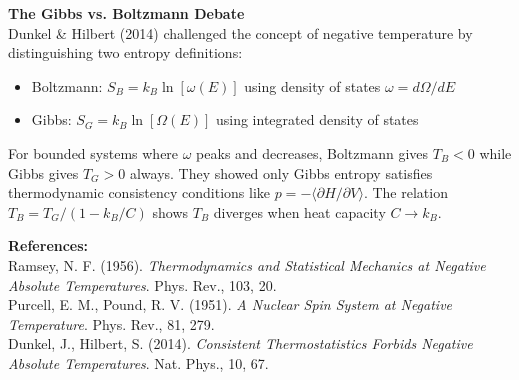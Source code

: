 \begin{technical}
\noindent\textbf{The Gibbs vs. Boltzmann Debate}\\[0.5em]
Dunkel \& Hilbert (2014) challenged the concept of negative temperature by distinguishing two entropy definitions:
\begin{itemize}[leftmargin=1em,itemsep=0pt,topsep=2pt]
\item Boltzmann: $S_B = k_B \ln[\omega(E)]$ using density of states $\omega = d\Omega/dE$
\item Gibbs: $S_G = k_B \ln[\Omega(E)]$ using integrated density of states
\end{itemize}
For bounded systems where $\omega$ peaks and decreases, Boltzmann gives $T_B < 0$ while Gibbs gives $T_G > 0$ always. They showed only Gibbs entropy satisfies thermodynamic consistency conditions like $p = -\langle \partial H/\partial V \rangle$. The relation $T_B = T_G/(1 - k_B/C)$ shows $T_B$ diverges when heat capacity $C \to k_B$.

\vspace{0.5em}
\noindent\textbf{References:}\\
Ramsey, N. F. (1956). \textit{Thermodynamics and Statistical Mechanics at Negative Absolute Temperatures}. Phys. Rev., 103, 20.\\
Purcell, E. M., Pound, R. V. (1951). \textit{A Nuclear Spin System at Negative Temperature}. Phys. Rev., 81, 279.\\
Dunkel, J., Hilbert, S. (2014). \textit{Consistent Thermostatistics Forbids Negative Absolute Temperatures}. Nat. Phys., 10, 67.
\end{technical}
